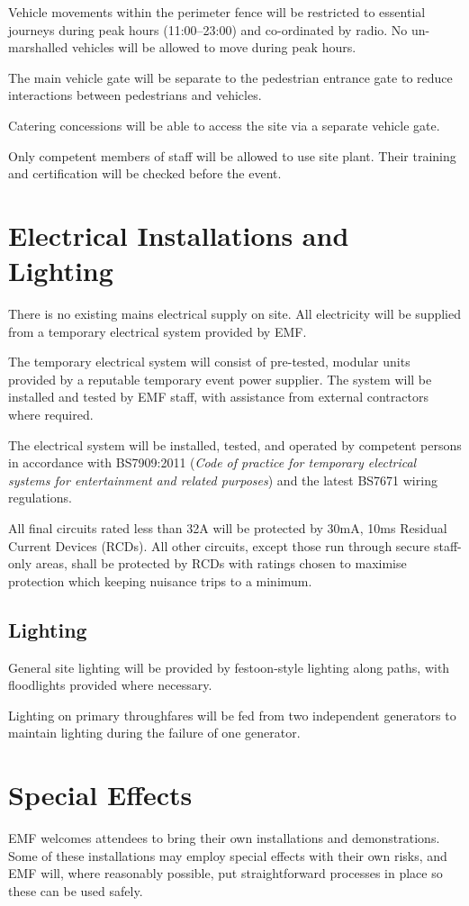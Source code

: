 Vehicle movements within the perimeter fence will be restricted to essential
journeys during peak hours (11:00--23:00) and co-ordinated by radio. No
un-marshalled vehicles will be allowed to move during peak hours.

The main vehicle gate will be separate to the pedestrian entrance gate to
reduce interactions between pedestrians and vehicles.

Catering concessions will be able to access the site via a separate
vehicle gate.

Only competent members of staff will be allowed to use site plant. Their
training and certification will be checked before the event.

\section{Electrical Installations and Lighting}

There is no existing mains electrical supply on site. All electricity will be
supplied from a temporary electrical system provided by EMF.

The temporary electrical system will consist of pre-tested, modular units
provided by a reputable temporary event power supplier. The system will be
installed and tested by EMF staff, with assistance from external contractors
where required.

The electrical system will be installed, tested, and operated by competent
persons in accordance with BS7909:2011 (\textit{Code of practice for temporary
electrical systems for entertainment and related purposes}) and the latest
BS7671 wiring regulations.

All final circuits rated less than 32A will be protected by 30mA, 10ms Residual
Current Devices (RCDs).  All other circuits, except those run through secure
staff-only areas, shall be protected by RCDs with ratings chosen to maximise
protection which keeping nuisance trips to a minimum.

\subsection{Lighting}
General site lighting will be provided by festoon-style lighting along paths,
with floodlights provided where necessary.

Lighting on primary throughfares will be fed from two independent generators
to maintain lighting during the failure of one generator.

\section{Special Effects}
EMF welcomes attendees to bring their own installations and demonstrations.
Some of these installations may employ special effects with their own risks,
and EMF will, where reasonably possible, put straightforward processes in
place so these can be used safely. 

